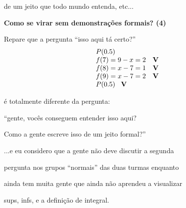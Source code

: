 \documentclass[oneside,12pt]{article}
\begin{document}
de um jeito que todo mundo entenda, etc...

\newpage

{\bf Como se virar sem demonstrações formais? (4)}

Repare que a pergunta ``isso aqui tá certo?''
%
$$\begin{array}{ll}
  P(0.5) \\
  f(7) = 9-x = 2 & \mathbf{V} \\ 
  f(8) = x-7 = 1 & \mathbf{V} \\ 
  f(9) = x-7 = 2 & \mathbf{V} \\ 
  P(0.5) \;\;\; \mathbf{V} \\
  \end{array}
$$

é totalmente diferente da pergunta:

\ssk

``gente, vocês conseguem entender isso aqui?

Como a gente escreve isso de um jeito formal?''

\msk

...e eu considero que a gente não deve discutir a segunda

pergunta nos grupos ``normais'' das duas turmas enquanto

ainda tem muita gente que ainda não aprendeu a visualizar

sups, infs, e a definição de integral.











\end{document}
